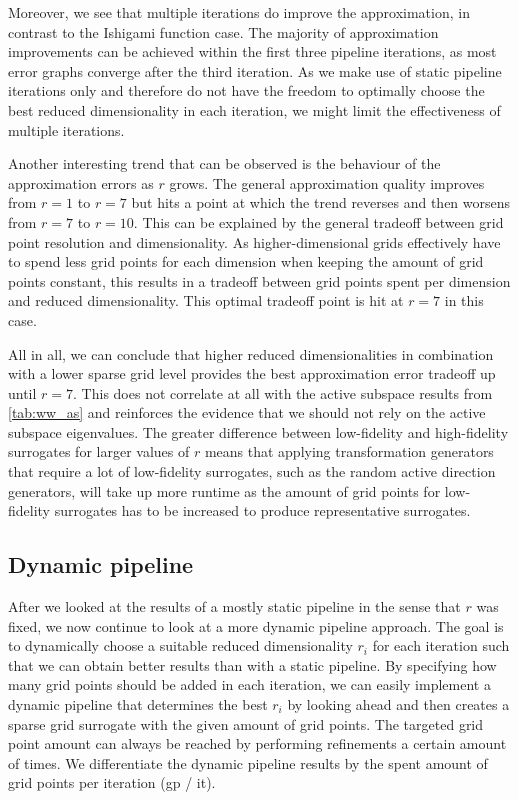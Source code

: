\documentclass[
  a4paper,  %
  twoside,  %
  bibliography=totoc,
  headsepline,
  cleardoublepage=empty,
  parskip=half,
  draft=false
]{scrbook}
\begin{document}
Moreover, we see that multiple iterations do improve the approximation, in contrast to the Ishigami function case.
The majority of approximation improvements can be achieved within the first three pipeline iterations, as most error graphs converge after the third iteration.
As we make use of static pipeline iterations only and therefore do not have the freedom to optimally choose the best reduced dimensionality in each iteration, we might limit the effectiveness of multiple iterations.

Another interesting trend that can be observed is the behaviour of the approximation errors as $r$ grows.
The general approximation quality improves from $r=1$ to $r=7$ but hits a point at which the trend reverses and then worsens from $r=7$ to $r=10$.
This can be explained by the general tradeoff between grid point resolution and dimensionality.
As higher-dimensional grids effectively have to spend less grid points for each dimension when keeping the amount of grid points constant, this results in a tradeoff between grid points spent per dimension and reduced dimensionality.
This optimal tradeoff point is hit at $r=7$ in this case.

All in all, we can conclude that higher reduced dimensionalities in combination with a lower sparse grid level provides the best approximation error tradeoff up until $r=7$.
This does not correlate at all with the active subspace results from \cref{tab:ww_as} and reinforces the evidence that we should not rely on the active subspace eigenvalues.
The greater difference between low-fidelity and high-fidelity surrogates for larger values of $r$ means that applying transformation generators that require a lot of low-fidelity surrogates, such as the random active direction generators, will take up more runtime as the amount of grid points for low-fidelity surrogates has to be increased to produce representative surrogates.

\subsection{Dynamic pipeline}

After we looked at the results of a mostly static pipeline in the sense that $r$ was fixed, we now continue to look at a more dynamic pipeline approach.
The goal is to dynamically choose a suitable reduced dimensionality $r_i$ for each iteration such that we can obtain better results than with a static pipeline.
By specifying how many grid points should be added in each iteration, we can easily implement a dynamic pipeline that determines the best $r_i$ by looking ahead and then creates a sparse grid surrogate with the given amount of grid points.
The targeted grid point amount can always be reached by performing refinements a certain amount of times.
We differentiate the dynamic pipeline results by the spent amount of grid points per iteration (gp / it).
\end{document}
